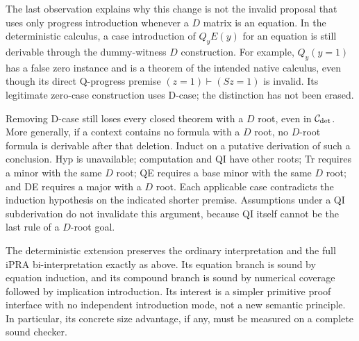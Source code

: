 The last observation explains why this change is not the invalid proposal
that uses only progress introduction whenever a $D$ matrix is an equation.
In the deterministic calculus, a case introduction of $Q_yE(y)$ for an
equation is still derivable through the dummy-witness $D$ construction.
For example, $Q_y(y=1)$ has a false zero instance and is a theorem of the
intended native calculus, even though its direct Q-progress premise
$(z=1)\vdash(Sz=1)$ is invalid.  Its legitimate zero-case construction
uses D-case; the distinction has not been erased.

Removing D-case still loses every closed theorem with a $D$ root, even
in $\mathcal C_{\rm det}$.  More generally, if a context contains no
formula with a $D$ root, no $D$-root formula is derivable after that
deletion.  Induct on a putative derivation of such a conclusion.
Hyp is unavailable; computation and QI have other roots; Tr requires
a minor with the same $D$ root; QE requires a base minor with the same
$D$ root; and DE requires a major with a $D$ root.  Each applicable
case contradicts the induction hypothesis on the indicated shorter
premise.  Assumptions under a QI subderivation do not invalidate this
argument, because QI itself cannot be the last rule of a $D$-root goal.

The deterministic extension preserves the ordinary interpretation and
the full iPRA bi-interpretation exactly as above.  Its equation branch
is sound by equation induction, and its compound branch is sound by
numerical coverage followed by implication introduction.  Its interest
is a simpler primitive proof interface with no independent introduction
mode, not a new semantic principle.  In particular, its concrete size
advantage, if any, must be measured on a complete sound checker.
